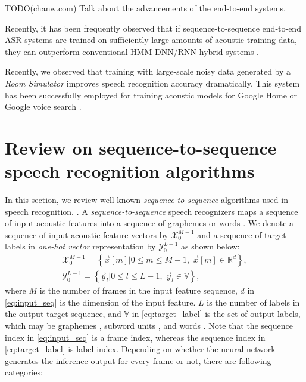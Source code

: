 \documentclass{article}
\begin{document}
TODO(chanw.com) Talk about the advancements of the end-to-end systems.


Recently, it has been frequently observed that if 
sequence-to-sequence end-to-end ASR systems are trained on sufficiently 
large amounts of acoustic training data, they can outperform
conventional HMM-DNN/RNN hybrid systems \cite{c_chiu_icassp_2018_00, 
c_kim_interspeech_2019_00}.


Recently, we observed that training with large-scale noisy data generated
by a \textit{Room Simulator} \cite{C_Kim_INTERSPEECH_2017_1}
improves speech recognition accuracy dramatically.
This system has been successfully employed
for training acoustic models for Google Home or Google voice
search \cite{C_Kim_INTERSPEECH_2017_1}.


\section{Review on sequence-to-sequence speech recognition algorithms}

In this section, we review well-known {\it sequence-to-sequence} algorithms
used in speech recognition.
\cite{
j_chorowski_nips_2015_00, 
a_graves_corr_2012_00, 
y_he_icassp_2019_00,
r_prabhavalkar_interspeech_2017_00}. 
A {\it sequence-to-sequence}
speech recognizers maps a sequence of input acoustic features into a sequence 
of graphemes  \cite{j_chorowski_nips_2015_00, w_chan_icassp_2016_00} or words 
\cite{r_prabhavalkar_interspeech_2017_00}. 
We denote a sequence of input acoustic feature vectors by 
$\mathcal{X}_{0}^{M-1}$ and a sequence of target labels in 
{\it one-hot vector} representation by 
$\mathcal{Y}_{0}^{L-1}$ as shown below:
\begin{subequations}
  \begin{align}
    \mathcal{X}_{0}^{M-1}  =  
      \left\{\vec{x}[m]
          \Big| 0 \le m \le M - 1, \; \vec{x}[m] \in \mathbb{R}^d \right\},  
    \label{eq:input_seq} \\
    \mathcal{Y}_{0}^{L-1}  =  
      \left\{\vec{y}_l  \Big| 0 \le l \le L-1, \; \vec{y}_l \in \mathbb{V} \right\}, 
    \label{eq:target_label}
  \end{align}
\end{subequations}
where $M$ is the number of frames in the input feature sequence,
$d$ in \eqref{eq:input_seq} is the dimension of the input feature.
$L$ is the number of labels in the output target sequence,
 and $\mathbb{V}$ in \eqref{eq:target_label} is the set of output
labels, which may be graphemes 
\cite{j_chorowski_nips_2015_00,
w_chan_icassp_2016_00},
subword units \cite{
a_zeyer_interspeech_2018_00,
c_chiu_icassp_2018_00},
 and words \cite{h_soltau_interspeech_2017_00}.
Note that the sequence index in \eqref{eq:input_seq} is a frame
index, whereas the sequence index in \eqref{eq:target_label} is 
label index. Depending on whether the neural network generates
the inference output for every frame or not, there are following
categories:
\end{document}
